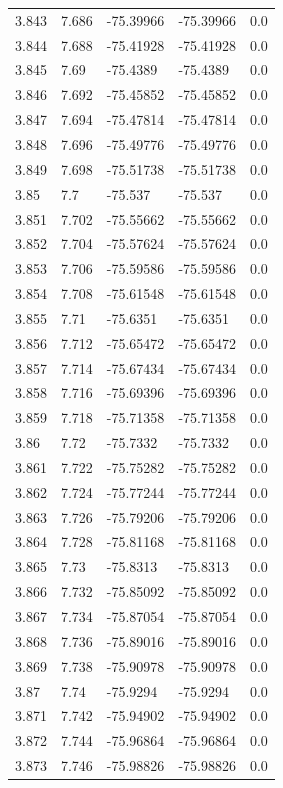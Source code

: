 \begin{tabular}{lllll}
3.843 & 7.686 & -75.39966 & -75.39966 & 0.0 \\
3.844 & 7.688 & -75.41928 & -75.41928 & 0.0 \\
3.845 & 7.69 & -75.4389 & -75.4389 & 0.0 \\
3.846 & 7.692 & -75.45852 & -75.45852 & 0.0 \\
3.847 & 7.694 & -75.47814 & -75.47814 & 0.0 \\
3.848 & 7.696 & -75.49776 & -75.49776 & 0.0 \\
3.849 & 7.698 & -75.51738 & -75.51738 & 0.0 \\
3.85 & 7.7 & -75.537 & -75.537 & 0.0 \\
3.851 & 7.702 & -75.55662 & -75.55662 & 0.0 \\
3.852 & 7.704 & -75.57624 & -75.57624 & 0.0 \\
3.853 & 7.706 & -75.59586 & -75.59586 & 0.0 \\
3.854 & 7.708 & -75.61548 & -75.61548 & 0.0 \\
3.855 & 7.71 & -75.6351 & -75.6351 & 0.0 \\
3.856 & 7.712 & -75.65472 & -75.65472 & 0.0 \\
3.857 & 7.714 & -75.67434 & -75.67434 & 0.0 \\
3.858 & 7.716 & -75.69396 & -75.69396 & 0.0 \\
3.859 & 7.718 & -75.71358 & -75.71358 & 0.0 \\
3.86 & 7.72 & -75.7332 & -75.7332 & 0.0 \\
3.861 & 7.722 & -75.75282 & -75.75282 & 0.0 \\
3.862 & 7.724 & -75.77244 & -75.77244 & 0.0 \\
3.863 & 7.726 & -75.79206 & -75.79206 & 0.0 \\
3.864 & 7.728 & -75.81168 & -75.81168 & 0.0 \\
3.865 & 7.73 & -75.8313 & -75.8313 & 0.0 \\
3.866 & 7.732 & -75.85092 & -75.85092 & 0.0 \\
3.867 & 7.734 & -75.87054 & -75.87054 & 0.0 \\
3.868 & 7.736 & -75.89016 & -75.89016 & 0.0 \\
3.869 & 7.738 & -75.90978 & -75.90978 & 0.0 \\
3.87 & 7.74 & -75.9294 & -75.9294 & 0.0 \\
3.871 & 7.742 & -75.94902 & -75.94902 & 0.0 \\
3.872 & 7.744 & -75.96864 & -75.96864 & 0.0 \\
3.873 & 7.746 & -75.98826 & -75.98826 & 0.0 \\

\end{tabular}
